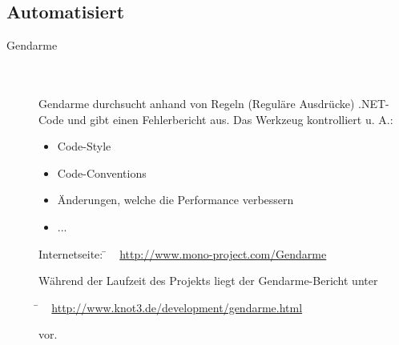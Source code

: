 
\clearpage



\subsection{Automatisiert}
\label{Abschnitt:Programmfehler:Werkzeuge:Automatisiert}



\begin{description}

	\item[Gendarme] \hfill
	\\
	\\
	Gendarme durchsucht anhand von Regeln (Reguläre Ausdrücke) .NET-Code und gibt einen Fehlerbericht aus. Das Werkzeug kontrolliert u. A.:
	\\
	
	\begin{itemize}
	
		\item Code-Style
		\item Code-Conventions
		\item Änderungen, welche die Performance verbessern
		\item ...
	
	\end{itemize}
			
	\begin{tabbing}
		Internetseite:
		\= ~ \href {http://www.mono-project.com/Gendarme}
                   {http://www.mono-project.com/Gendarme}
		\\
	\end{tabbing}
	
	Während der Laufzeit des Projekts liegt der Gendarme-Bericht unter
	\begin{tabbing}
			\= ~ \href {http://www.knot3.de/development/gendarme.html}
     			       {http://www.knot3.de/development/gendarme.html}
     			   
	\end{tabbing} vor.
	
\end{description}



